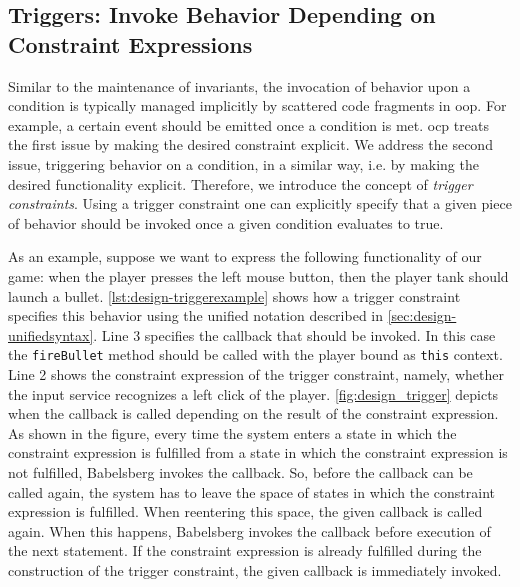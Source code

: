 \subsection{Triggers: Invoke Behavior Depending on Constraint Expressions}
\label{sec:design-trigger}
Similar to the maintenance of invariants, the invocation of behavior upon a condition is typically managed implicitly by scattered code fragments in \gls{oop}. For example, a certain event should be emitted once a condition is met.
\gls{ocp} treats the first issue by making the desired constraint explicit.
We address the second issue, triggering behavior on a condition, in a similar way, i.e. by making the desired functionality explicit.
Therefore, we introduce the concept of \emph{trigger constraints}.
Using a trigger constraint one can explicitly specify that a given piece of behavior should be invoked once a given condition evaluates to true.

As an example, suppose we want to express the following functionality of our game: when the player presses the left mouse button, then the player tank should launch a bullet.
\autoref{lst:design-triggerexample} shows how a trigger constraint specifies this behavior using the unified notation described in \autoref{sec:design-unifiedsyntax}.
Line 3 specifies the callback that should be invoked. In this case the \texttt{fireBullet} method should be called with the player bound as \texttt{this} context.
Line 2 shows the constraint expression of the trigger constraint, namely, whether the input service recognizes a left click of the player.
\autoref{fig:design_trigger} depicts when the callback is called depending on the result of the constraint expression.
As shown in the figure, every time the system enters a state in which the constraint expression is fulfilled from a state in which the constraint expression is not fulfilled, Babelsberg invokes the callback.
So, before the callback can be called again, the system has to leave the space of states in which the constraint expression is fulfilled. When reentering this space, the given callback is called again.
When this happens, Babelsberg invokes the callback before execution of the next statement.
If the constraint expression is already fulfilled during the construction of the trigger constraint, the given callback is immediately invoked.

